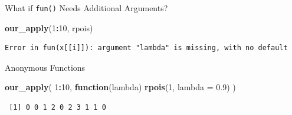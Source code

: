 \documentclass[
  ignorenonframetext,
  aspectratio=1610,
  onlytextwidth]{beamer}
\newenvironment{Shaded}{\begin{snugshade}}{\end{snugshade}}
\newcommand{\AttributeTok}[1]{\textcolor[rgb]{0.13,0.29,0.53}{#1}}
\newcommand{\ControlFlowTok}[1]{\textcolor[rgb]{0.13,0.29,0.53}{\textbf{#1}}}
\newcommand{\DecValTok}[1]{\textcolor[rgb]{0.00,0.00,0.81}{#1}}
\newcommand{\FloatTok}[1]{\textcolor[rgb]{0.00,0.00,0.81}{#1}}
\newcommand{\FunctionTok}[1]{\textcolor[rgb]{0.13,0.29,0.53}{\textbf{#1}}}
\newcommand{\NormalTok}[1]{#1}
\newcommand{\SpecialCharTok}[1]{\textcolor[rgb]{0.81,0.36,0.00}{\textbf{#1}}}
\begin{document}
\begin{frame}[fragile]{What if \texttt{fun()} Needs Additional
Arguments?}
\label{what-if-fun-needs-additional-arguments}
\begin{Shaded}
\begin{Highlighting}[]
\FunctionTok{our\_apply}\NormalTok{(}\DecValTok{1}\SpecialCharTok{:}\DecValTok{10}\NormalTok{, rpois)}
\end{Highlighting}
\end{Shaded}

\begin{verbatim}
Error in fun(x[[i]]): argument "lambda" is missing, with no default
\end{verbatim}

\pause

\begin{block}{Anonymous Functions}
\label{anonymous-functions}
\begin{Shaded}
\begin{Highlighting}[]
\FunctionTok{our\_apply}\NormalTok{(}
  \DecValTok{1}\SpecialCharTok{:}\DecValTok{10}\NormalTok{,}
  \ControlFlowTok{function}\NormalTok{(lambda) }\FunctionTok{rpois}\NormalTok{(}\DecValTok{1}\NormalTok{, }\AttributeTok{lambda =} \FloatTok{0.9}\NormalTok{)}
\NormalTok{)}
\end{Highlighting}
\end{Shaded}

\begin{verbatim}
 [1] 0 0 1 2 0 2 3 1 1 0
\end{verbatim}
\end{block}
\end{frame}
\end{document}

